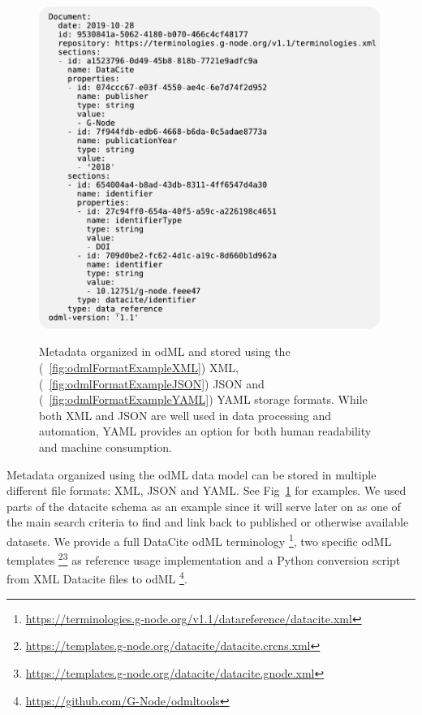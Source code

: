 \documentclass{article}
\begin{document}
\begin{figure}
\begin{minipage}[b]{.3\linewidth}
     \label{fig:odmlFormatExampleJSON}
   \end{minipage}
   \begin{minipage}[b]{.3\linewidth}
     \centering
     \includegraphics[width=0.99\textwidth]{figures/figFormatExampleC.pdf}
     \label{fig:odmlFormatExampleYAML}
   \end{minipage}
   \caption{Metadata organized in odML and stored using the (~\ref{fig:odmlFormatExampleXML}) XML, (~\ref{fig:odmlFormatExampleJSON}) JSON and (~\ref{fig:odmlFormatExampleYAML}) YAML storage formats. While both XML and JSON are well used in data processing and automation, YAML provides an option for both human readability and machine consumption.}
   \label{fig:odmlFormatExample}
\end{figure}

Metadata organized using the odML data model can be stored in multiple different file formats: XML, JSON and YAML. See Fig~\ref{fig:odmlFormatExample} for examples.   We used parts of the datacite schema as an example since it will serve later on as one of the main search criteria to find and link back to published or otherwise available datasets. We provide a full DataCite odML terminology \footnote{\url{https://terminologies.g-node.org/v1.1/datareference/datacite.xml}}, two specific odML templates \footnote{\url{https://templates.g-node.org/datacite/datacite.crcns.xml}}\footnote{\url{https://templates.g-node.org/datacite/datacite.gnode.xml}} as reference usage implementation and a Python conversion script from XML Datacite files to odML \footnote{\url{https://github.com/G-Node/odmltools}}.
\end{document}

